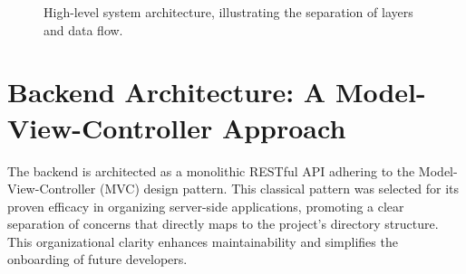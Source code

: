 \begin{figure}[H]
    \centering
    \begin{tikzpicture}[
        node distance=2.5cm and 3cm
    ]




    \end{tikzpicture}
    \caption{High-level system architecture, illustrating the separation of layers and data flow.}
    \label{fig:high-level-arch}
\end{figure}

\section{Backend Architecture: A Model-View-Controller Approach}

The backend is architected as a monolithic RESTful API adhering to the Model-View-Controller (MVC) design pattern. This classical pattern was selected for its proven efficacy in organizing server-side applications, promoting a clear separation of concerns that directly maps to the project's directory structure. This organizational clarity enhances maintainability and simplifies the onboarding of future developers.

